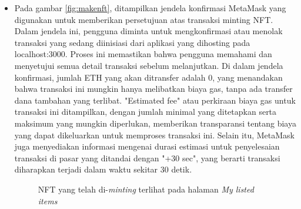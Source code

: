 \begin{itemize}
      \item 
      Pada gambar \ref{fig:makenft}, ditampilkan jendela konfirmasi MetaMask yang digunakan untuk memberikan persetujuan atas transaksi minting NFT. Dalam jendela ini, pengguna diminta untuk mengkonfirmasi atau menolak transaksi yang sedang diinisiasi dari aplikasi yang dihosting pada localhost:3000. Proses ini memastikan bahwa pengguna memahami dan menyetujui semua detail transaksi sebelum melanjutkan. Di dalam jendela konfirmasi, jumlah ETH yang akan ditransfer adalah 0, yang menandakan bahwa transaksi ini mungkin hanya melibatkan biaya gas, tanpa ada transfer dana tambahan yang terlibat. "Estimated fee" atau perkiraan biaya gas untuk transaksi ini ditampilkan, dengan jumlah minimal yang ditetapkan serta maksimum yang mungkin diperlukan, memberikan transparansi tentang biaya yang dapat dikeluarkan untuk memproses transaksi ini. Selain itu, MetaMask juga menyediakan informasi mengenai durasi estimasi untuk penyelesaian transaksi di pasar yang ditandai dengan "+30 sec", yang berarti transaksi diharapkan terjadi dalam waktu sekitar 30 detik.

      
      \begin{figure} [H] \centering
        \caption{NFT yang telah di-\emph{minting} terlihat pada halaman \emph{My listed items}}
        \label{fig:listeditem}
      \end{figure}


\end{itemize}
